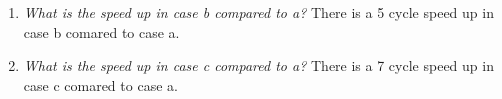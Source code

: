 \documentclass{article}
\begin{document}
\begin{enumerate}[label=(\alph*)]
    \item \textit{What is the speed up in case b compared to a?}
        \newline
        \newline
        There is a 5 cycle speed up in case b comared to case a.
    \item \textit{What is the speed up in case c compared to a?}
        \newline
        \newline
        There is a 7 cycle speed up in case c comared to case a.
\end{enumerate}
\end{document}
